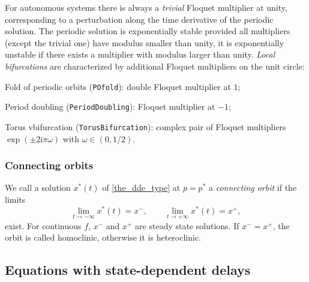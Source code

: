 \documentclass[10pt]{scrartcl}
\newcommand{\define}[1]{\emph{#1}}
\renewcommand{\i}{\mathrm{i}}
\newcommand{\blist}[1]{\mbox{\lstinline!#1!}}
\begin{document}
For autonomous systems there is always a \define{trivial} Floquet
multiplier at unity, corresponding to a perturbation along the time
derivative of the periodic solution. The periodic solution is
exponentially stable provided all multipliers (except the trivial one)
have modulus smaller than unity, it is exponentially unstable if there
exists a multiplier with modulus larger than unity. \emph{Local
  bifurcations} are characterized by additional Floquet multipliers on
the unit circle:
\begin{compactitem}
\item Fold of periodic orbits (\blist{POfold}): double Floquet multiplier at $1$;
\item Period doubling (\blist{PeriodDoubling}): Floquet multiplier at $-1$;
\item Torus vbifurcation (\blist{TorusBifurcation}): complex pair of
  Floquet multipliers $\exp(\pm2\i\pi\omega)$ with $\omega\in(0,1/2)$.
\end{compactitem}


\subsubsection{Connecting orbits}
\label{sec:dde:hcli}
We call a solution $x^*(t)$ of \cref{the_dde_type} at $p=p^*$ a 
\textit{connecting orbit} if the limits 
\begin{equation}
\lim_{t\to -\infty} x^*(t)=x^{-}, \qquad \lim_{t\to +\infty} x^*(t)=x^{+},
\end{equation}
exist.  For continuous $f$, $x^-$ and $x^+$ 
are steady state solutions. 
If $x^-=x^+$, the orbit is called homoclinic, otherwise it is heteroclinic. 

\subsection{Equations with state-dependent delays}\label{sd_dde}
\end{document}
